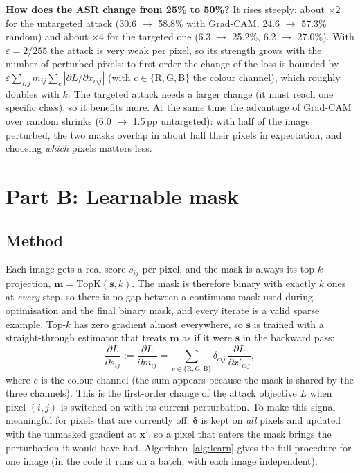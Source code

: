 \documentclass[10pt,a4paper]{article}
\newcommand{\x}{\mathbf{x}}
\newcommand{\m}{\mathbf{m}}
\newcommand{\dd}{\boldsymbol{\delta}}
\begin{document}
\textbf{How does the ASR change from 25\% to 50\%?} It rises steeply: about
$\times2$ for the untargeted attack (30.6 $\to$ 58.8\% with Grad-CAM, 24.6 $\to$
57.3\% random) and about $\times4$ for the targeted one (6.3 $\to$ 25.2\%, 6.2
$\to$ 27.0\%). With $\varepsilon=2/255$ the attack is very weak per pixel, so its
strength grows with the number of perturbed pixels: to first order the change of
the loss is bounded by $\varepsilon\sum_{i,j}m_{ij}\sum_{c}|\partial L/\partial x_{cij}|$
(with $c\in\{\mathrm{R},\mathrm{G},\mathrm{B}\}$ the colour channel),
which roughly doubles with $k$. The targeted attack needs a larger change (it must
reach one specific class), so it benefits more. At the same time the advantage of
Grad-CAM over random shrinks (6.0 $\to$ 1.5\,pp untargeted): with half of the
image perturbed, the two masks overlap in about half their pixels in expectation,
and choosing \emph{which} pixels matters less.

\section{Part B: Learnable mask}
\label{sec:b}

\subsection{Method}

Each image gets a real score $s_{ij}$ per pixel, and the mask is always its top-$k$
projection, $\m=\mathrm{TopK}(\mathbf{s},k)$. The mask is therefore binary with
exactly $k$ ones at \emph{every} step, so there is no gap between a continuous mask
used during optimisation and the final binary mask, and every iterate is a valid
sparse example. Top-$k$ has zero gradient almost everywhere, so $\mathbf{s}$ is trained
with a straight-through estimator that treats $\m$ as if it were $\mathbf{s}$ in the
backward pass:
\[
\frac{\partial L}{\partial s_{ij}} := \frac{\partial L}{\partial m_{ij}}
= \sum_{c\in\{\mathrm{R},\mathrm{G},\mathrm{B}\}}\delta_{cij}\,\frac{\partial L}{\partial x'_{cij}},
\]
where $c$ is the colour channel (the sum appears because the mask is shared by the
three channels). This is the first-order change of the attack objective $L$ when
pixel $(i,j)$ is switched on with its current perturbation. To make this signal meaningful for pixels that are
currently off, $\dd$ is kept on \emph{all} pixels and updated with the unmasked
gradient at $\x'$, so a pixel that enters the mask brings the perturbation it would
have had. Algorithm~\ref{alg:learn} gives the full procedure for one image (in
the code it runs on a batch, with each image independent).
\end{document}
